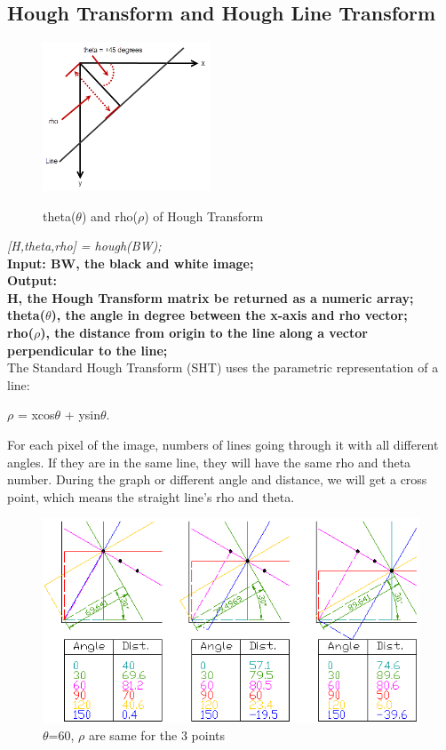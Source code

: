 \subsection{Hough Transform and Hough Line Transform}
\begin{figure}
\includegraphics[width=5cm]{pic/SHT-example.png}\\
\caption{theta($\theta$) and rho($\rho$) of Hough Transform}
\end{figure}
\vspace{3mm}
\textit{[H,theta,rho] = hough(BW);}\\
\newline
\textbf{Input: BW, the black and white image;}\\
\textbf{Output:\\ H, the Hough Transform matrix be returned as a numeric array;}\\ 
\textbf{theta($\theta$), the angle in degree between the x-axis and rho vector;}\\
\textbf{rho($\rho$), the distance from origin to the line along a vector perpendicular to the line;}\\
\newline
The Standard Hough Transform (SHT) uses the parametric representation of a line: \begin{center} $\rho$ = xcos$\theta$ + ysin$\theta$.\end{center} 
For each pixel of the image, numbers of lines going through it with all different angles. If they are in the same line, they will have the same rho and theta number. During the graph or different angle and distance, we will get a cross point, which means the straight line’s rho and theta.\\ 
\begin{figure}[ht]
    \includegraphics[scale=0.7]{pic/SHT-example2.png}
    \caption{$\theta$=60, $\rho$ are same for the 3 points}
\end{figure}
